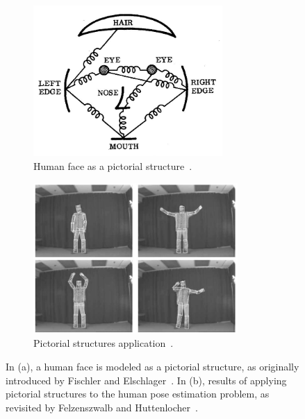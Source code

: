 \begin{figure}[h]\centering
    \begin{subfigure}{0.49\textwidth}\centering
        \includegraphics[height=5.75cm]{figures/fischler.jpg} 
        \caption{Human face as a pictorial structure~\cite{Fischler1973-bi}.}
        \label{subfig:fischler}
    \end{subfigure}
    \begin{subfigure}{0.49\textwidth}\centering
        \includegraphics[height=5.75cm]{figures/felzenszwalb.jpg}
        \caption{Pictorial structures application~\cite{felzenszwalb2005pictorial}.}
        \label{subfig:felzenszwalb}
    \end{subfigure}
    \caption{In (a), a human face is modeled as a pictorial structure, as originally introduced by Fischler and Elschlager~\cite{Fischler1973-bi}. In (b), results of applying pictorial structures to the human pose estimation problem, as revisited by Felzenszwalb and Huttenlocher~\cite{felzenszwalb2005pictorial}.}
    \label{fig:pictorial_structures}
\end{figure}


